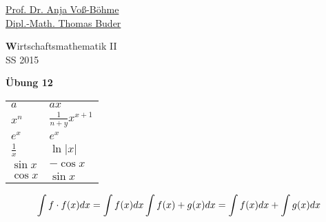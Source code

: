 \documentclass[12pt,a4paper]{scrreprt}
\begin{document}
\begin{flushleft}
\href{mailto:anja.voss-boehme@htw-dresden.de}{Prof. Dr. Anja Voß-Böhme} \\
\href{mailto:buder@htw-dresden.de}{Dipl.-Math. Thomas Buder}
\end{flushleft}

\begin{center}{\large\textbf Wirtschaftsmathematik II} \\ SS 2015 \end{center}

\begin{center}{\large\textbf{Übung 12}} 
\end{center}

\begin{tabular}{ll}
$a$		&	$ax$ 	\\
$x^n$	&	$\frac{1}{n+y}x^{x+1}$	\\
$e^x$	&	$e^x$	\\
$\frac{1}{x}$	&	$\ln|x|$	\\
$\sin x$	&	$-\cos x$	\\
$\cos x$	&	$\sin x$	\\
\end{tabular}


\[
\int{f \cdot f(x)} dx	=	\int f(x) dx \\
\int f(x)+g(x) dx	=	\int f(x) dx + \int g(x) dx	\\
\]
\end{document}
